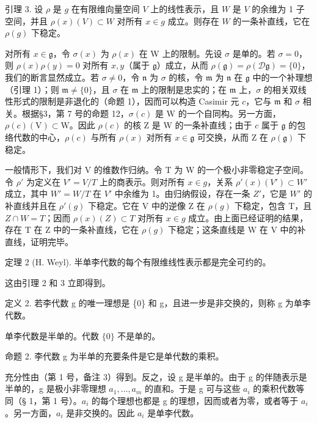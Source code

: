引理 3. 设 \(\rho\) 是 \(g\) 在有限维向量空间 \(V\) 上的线性表示，且 \(W\) 是 \(V\) 的余维为 1 子空间，并且 \(\rho(x)(V) \subset W\) 对所有 \(x \in g\) 成立。则存在 \(W\) 的一条补直线，它在 \(\rho(g)\) 下稳定。

对所有 \(x \in \mathfrak{g}\)，令 \(\sigma(x)\) 为 \(\rho(x)\) 在 W 上的限制。先设 \(\sigma\) 是单的。若 \(\sigma = 0\)，则 \(\rho(x)\rho(y) = 0\) 对所有 \(x,y\)（属于 \(\mathfrak{g}\)）成立，从而 \(\rho(\mathfrak{g}) = \rho(\mathcal{D}\mathfrak{g}) = \{0\}\)，我们的断言显然成立。若 \(\sigma \neq 0\)，令 \(\mathfrak{n}\) 为 \(\sigma\) 的核，令 \(\mathfrak{m}\) 为 \(\mathfrak{n}\) 在 \(\mathfrak{g}\) 中的一个补理想（引理 1）；则 \(\mathfrak{m} \neq \{0\}\)，且 \(\sigma\) 在 \(\mathfrak{m}\) 上的限制是忠实的；在 \(\mathfrak{m}\) 上，\(\sigma\) 的相关双线性形式的限制是非退化的（命题 1），因而可以构造 Casimir 元 \(c\)，它与 \(\mathfrak{m}\) 和 \(\sigma\) 相关。根据§3，第 7 号的命题 12，\(\sigma(c)\) 是 W 的一个自同构。另一方面，\(\rho(c)(\mathrm{V}) \subset \mathrm{W}\)。因此 \(\rho(c)\) 的核 Z 是 W 的一条补直线；由于 \(c\) 属于 \(\mathfrak{g}\) 的包络代数的中心，\(\rho(c)\) 与所有 \(\rho(x)\) 对所有 \(x \in \mathfrak{g}\) 可交换，从而 Z 在 \(\rho(\mathfrak{g})\) 下稳定。

一般情形下，我们对 V 的维数作归纳。令 T 为 W 的一个极小非零稳定子空间。令 \(\rho'\) 为定义在 \(V' = V/T\) 上的商表示。则对所有 \(x \in g\)，关系 \(\rho'(x)(V') \subset W'\) 成立，其中 \(W' = W/T\) 在 \(V'\) 中余维为 1。由归纳假设，存在一条 \(Z'\)，它是 \(W'\) 的补直线并且在 \(\rho'(g)\) 下稳定。它在 V 中的逆像 Z 在 \(\rho(g)\) 下稳定，包含 T，且 \(Z \cap W = T\)；因而 \(\rho(x)(Z) \subset T\) 对所有 \(x \in g\) 成立。由上面已经证明的结果，存在 T 在 Z 中的一条补直线，它在 \(\rho(g)\) 下稳定；这条直线是 W 在 V 中的补直线，证明完毕。

定理 2 (H. Weyl). 半单李代数的每个有限维线性表示都是完全可约的。

这由引理 2 和 3 立即得到。

定义 2. 若李代数 g 的唯一理想是 \{0\} 和 g，且进一步是非交换的，则称 g 为单李代数。

单李代数是半单的。代数 \(\{0\}\) 不是单的。

命题 2. 李代数 g 为半单的充要条件是它是单代数的乘积。

充分性由（第 1 号，备注 3）得到。反之，设 g 是半单的。由于 g 的伴随表示是半单的，g 是极小非零理想 \(a_{1}, \ldots, a_{m}\) 的直和。于是 g 可与这些 \(a_{i}\) 的乘积代数等同（§ 1，第 1 号）。\(a_{i}\) 的每个理想也都是 g 的理想，因而或者为零，或者等于 \(a_{i}\)。另一方面，\(a_{i}\) 是非交换的。因此 \(a_{i}\) 是单李代数。

